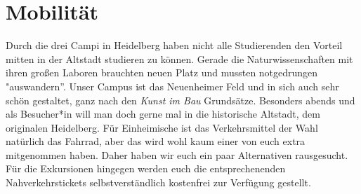 \section{Mobilität}
  Durch die drei Campi in Heidelberg haben nicht alle Studierenden den Vorteil mitten
  in der Altstadt studieren zu können. Gerade die Naturwissenschaften mit ihren großen
  Laboren brauchten neuen Platz und mussten notgedrungen "auswandern''. Unser Campus ist
  das Neuenheimer Feld und in sich auch sehr schön gestaltet, ganz nach den \textit{Kunst im Bau} Grundsätze.
Besonders abends und als Besucher*in will man doch gerne mal in die historische Altstadt, dem originalen Heidelberg.
  Für Einheimische ist das Verkehrsmittel der Wahl natürlich das Fahrrad, aber das wird wohl
  kaum einer von euch extra mitgenommen haben. Daher haben wir euch ein paar Alternativen
  rausgesucht.
Für die Exkursionen hingegen werden euch die entsprechenenden Nahverkehrstickets selbstverständlich kostenfrei zur Verfügung gestellt.

